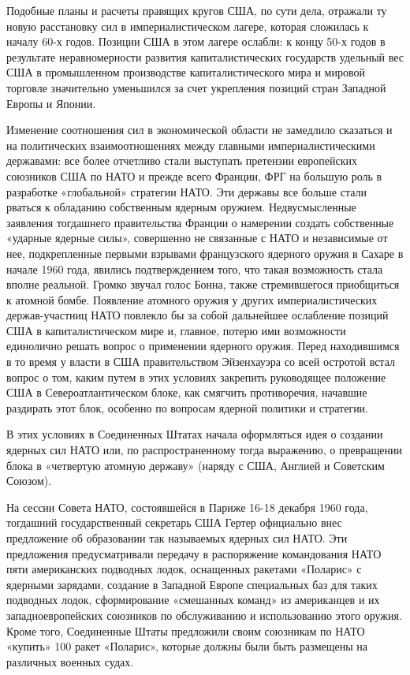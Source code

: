 \documentclass[12pt, a4paper, openany]{book}
\begin{document}
	Подобные планы и расчеты правящих кругов США, по сути дела, отражали ту новую расстановку сил в империалистическом лагере, которая сложилась к началу 60-х годов. Позиции США в этом лагере ослабли: к концу 50-х годов в результате неравномерности развития капиталистических государств удельный вес США в промышленном производстве капиталистического мира и мировой торговле значительно уменьшился за счет укрепления позиций стран Западной Европы и Японии.
	
	Изменение соотношения сил в экономической области не замедлило сказаться и на политических взаимоотношениях между главными империалистическими державами: все более отчетливо стали выступать претензии европейских союзников США по НАТО и прежде всего Франции, ФРГ на большую роль в разработке «глобальной» стратегии НАТО. Эти державы все больше стали рваться к обладанию собственным ядерным оружием. Недвусмысленные заявления тогдашнего правительства Франции о намерении создать собственные «ударные ядерные силы», совершенно не связанные с НАТО и независимые от нее, подкрепленные первыми взрывами французского ядерного оружия в Сахаре в начале 1960 года, явились подтверждением того, что такая возможность стала вполне реальной. Громко звучал голос Бонна, также стремившегося приобщиться к атомной бомбе. Появление атомного оружия у других империалистических держав-участниц НАТО повлекло бы за собой дальнейшее ослабление позиций США в капиталистическом мире и, главное, потерю ими возможности единолично решать вопрос о применении ядерного оружия. Перед находившимся в то время у власти в США правительством Эйзенхауэра со всей остротой встал вопрос о том, каким путем в этих условиях закрепить руководящее положение США в Североатлантическом блоке, как смягчить противоречия, начавшие раздирать этот блок, особенно по вопросам ядерной политики и стратегии.
	
	
	
	В этих условиях в Соединенных Штатах начала оформляться идея о создании ядерных сил НАТО или, по распространенному тогда выражению, о превращении блока в «четвертую атомную державу» (наряду с США, Англией и Советским Союзом).
	
	На сессии Совета НАТО, состоявшейся в Париже 16-18 декабря 1960 года, тогдашний государственный секретарь США Гертер официально внес предложение об образовании так называемых ядерных сил НАТО. Эти предложения предусматривали передачу в распоряжение командования НАТО пяти американских подводных лодок, оснащенных ракетами «Поларис» с ядерными зарядами, создание в Западной Европе специальных баз для таких подводных лодок, сформирование «смешанных команд» из американцев и их западноевропейских союзников по обслуживанию и использованию этого оружия. Кроме того, Соединенные Штаты предложили своим союзникам по НАТО «купить» 100 ракет «Поларис», которые должны были быть размещены на различных военных судах.
	
\end{document}
